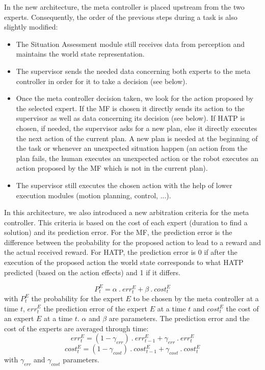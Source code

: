 \documentclass[english,a4paper,11pt,twoside]{StyleThese}
\begin{document}
In the new architecture, the meta controller is placed upstream from the two experts. Consequently, the order of the previous steps during a task is also slightly modified:
\begin{itemize}
\item The Situation Assessment module still receives data from perception and maintains the world state representation. 
\item The supervisor sends the needed data concerning both experts to the meta controller in order for it to take a decision (see below). 
\item Once the meta controller decision taken, we look for the action proposed by the selected expert. If the MF is chosen it directly sends its action to the supervisor as well as data concerning its decision (see below). If HATP is chosen, if needed, the supervisor asks for a new plan, else it directly executes the next action of the current plan. A new plan is needed at the beginning of the task or whenever an unexpected situation happen (an action from the plan fails, the human executes an unexpected action or the robot executes an action proposed by the MF which is not in the current plan).
\item The supervisor still executes the chosen action with the help of lower execution modules (motion planning, control, ...). 
\end{itemize}

In this architecture, we also introduced a new arbitration criteria for the meta controller. This criteria is based on the cost of each expert (duration to find a solution) and its prediction error. For the MF, the prediction error is the difference between the probability for the proposed action to lead to a reward and the actual received reward. For HATP, the prediction error is 0 if after the execution of the proposed action the world state corresponds to what HATP predicted (based on the action effects) and 1 if it differs.

$$P^E_t = \alpha \ . \ err^E_t + \beta \ . \ cost^E_t$$
with $P^E_t$ the probability for the expert $E$ to be chosen by the meta controller at a time $t$, $err^E_t$ the prediction error of the expert $E$ at a time $t$ and $cost^E_t$ the cost of an expert $E$ at a time $t$. $\alpha$ and $\beta$ are parameters. The prediction error and the cost of the experts are averaged through time:
$$err^E_t = (1- \gamma_{err}) \ . \ err^E_{t-1} + \gamma_{err} \ . \ err^E_t$$
$$cost^E_t = (1- \gamma_{cost}) \ . \ cost^E_{t-1} + \gamma_{cost} \ . \ cost^E_t$$
with $\gamma_{err}$ and $\gamma_{cost}$ parameters.
\end{document}
